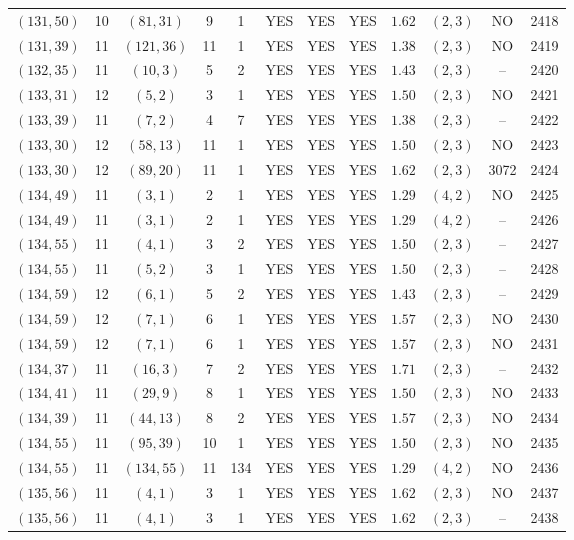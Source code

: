 \begin{longtable}{|c|c|c|c|c|c|c|c|c|c|c|c|}
$(131,50)$ & 10 & $(81,31)$ & 9 & 1 & YES & YES & YES & $1.62$ & $(2,3)$ & NO & 2418\\
$(131,39)$ & 11 & $(121,36)$ & 11 & 1 & YES & YES & YES & $1.38$ & $(2,3)$ & NO & 2419\\
$(132,35)$ & 11 & $(10,3)$ & 5 & 2 & YES & YES & YES & $1.43$ & $(2,3)$ & -- & 2420\\
$(133,31)$ & 12 & $(5,2)$ & 3 & 1 & YES & YES & YES & $1.50$ & $(2,3)$ & NO & 2421\\
$(133,39)$ & 11 & $(7,2)$ & 4 & 7 & YES & YES & YES & $1.38$ & $(2,3)$ & -- & 2422\\
$(133,30)$ & 12 & $(58,13)$ & 11 & 1 & YES & YES & YES & $1.50$ & $(2,3)$ & NO & 2423\\
$(133,30)$ & 12 & $(89,20)$ & 11 & 1 & YES & YES & YES & $1.62$ & $(2,3)$ & 3072 & 2424\\
$(134,49)$ & 11 & $(3,1)$ & 2 & 1 & YES & YES & YES & $1.29$ & $(4,2)$ & NO & 2425\\
$(134,49)$ & 11 & $(3,1)$ & 2 & 1 & YES & YES & YES & $1.29$ & $(4,2)$ & -- & 2426\\
$(134,55)$ & 11 & $(4,1)$ & 3 & 2 & YES & YES & YES & $1.50$ & $(2,3)$ & -- & 2427\\
$(134,55)$ & 11 & $(5,2)$ & 3 & 1 & YES & YES & YES & $1.50$ & $(2,3)$ & -- & 2428\\
$(134,59)$ & 12 & $(6,1)$ & 5 & 2 & YES & YES & YES & $1.43$ & $(2,3)$ & -- & 2429\\
$(134,59)$ & 12 & $(7,1)$ & 6 & 1 & YES & YES & YES & $1.57$ & $(2,3)$ & NO & 2430\\
$(134,59)$ & 12 & $(7,1)$ & 6 & 1 & YES & YES & YES & $1.57$ & $(2,3)$ & NO & 2431\\
$(134,37)$ & 11 & $(16,3)$ & 7 & 2 & YES & YES & YES & $1.71$ & $(2,3)$ & -- & 2432\\
$(134,41)$ & 11 & $(29,9)$ & 8 & 1 & YES & YES & YES & $1.50$ & $(2,3)$ & NO & 2433\\
$(134,39)$ & 11 & $(44,13)$ & 8 & 2 & YES & YES & YES & $1.57$ & $(2,3)$ & NO & 2434\\
$(134,55)$ & 11 & $(95,39)$ & 10 & 1 & YES & YES & YES & $1.50$ & $(2,3)$ & NO & 2435\\
$(134,55)$ & 11 & $(134,55)$ & 11 & 134 & YES & YES & YES & $1.29$ & $(4,2)$ & NO & 2436\\
$(135,56)$ & 11 & $(4,1)$ & 3 & 1 & YES & YES & YES & $1.62$ & $(2,3)$ & NO & 2437\\
$(135,56)$ & 11 & $(4,1)$ & 3 & 1 & YES & YES & YES & $1.62$ & $(2,3)$ & -- & 2438\\

\end{longtable}
